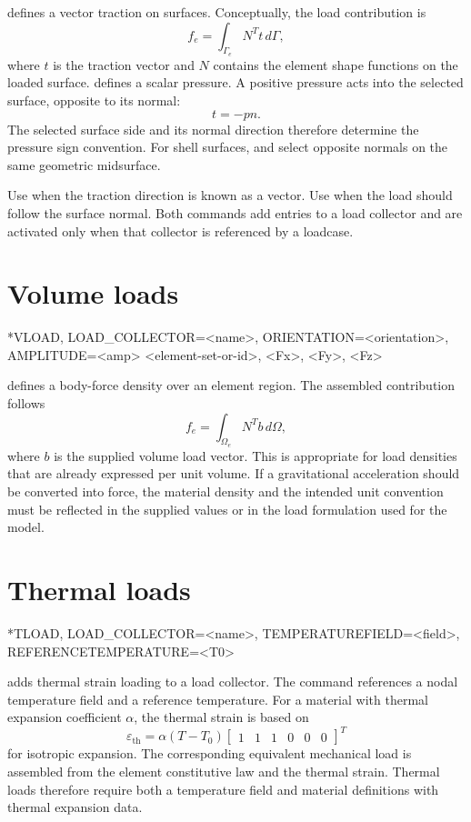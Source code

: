  defines a vector traction on surfaces. Conceptually, the load contribution is
\[
f_e = \int_{\Gamma_e} N^T t \, d\Gamma ,
\]
where \(t\) is the traction vector and \(N\) contains the element shape functions on the loaded surface.  defines a scalar pressure. A positive pressure acts into the selected surface, opposite to its normal:
\[
t = -p n .
\]
The selected surface side and its normal direction therefore determine the pressure sign convention. For shell surfaces,  and  select opposite normals on the same geometric midsurface.

Use  when the traction direction is known as a vector. Use  when the load should follow the surface normal. Both commands add entries to a load collector and are activated only when that collector is referenced by a loadcase.

\section{Volume loads}

\begin{syntax}
*VLOAD, LOAD_COLLECTOR=<name>, ORIENTATION=<orientation>, AMPLITUDE=<amp>
<element-set-or-id>, <Fx>, <Fy>, <Fz>
\end{syntax}

 defines a body-force density over an element region. The assembled contribution follows
\[
f_e = \int_{\Omega_e} N^T b \, d\Omega ,
\]
where \(b\) is the supplied volume load vector. This is appropriate for load densities that are already expressed per unit volume. If a gravitational acceleration should be converted into force, the material density and the intended unit convention must be reflected in the supplied values or in the load formulation used for the model.

\section{Thermal loads}

\begin{syntax}
*TLOAD, LOAD_COLLECTOR=<name>, TEMPERATUREFIELD=<field>, REFERENCETEMPERATURE=<T0>
\end{syntax}

 adds thermal strain loading to a load collector. The command references a nodal temperature field and a reference temperature. For a material with thermal expansion coefficient \(\alpha\), the thermal strain is based on
\[
\varepsilon_\mathrm{th} = \alpha (T - T_0)
\begin{bmatrix}
1 & 1 & 1 & 0 & 0 & 0
\end{bmatrix}^T
\]
for isotropic expansion. The corresponding equivalent mechanical load is assembled from the element constitutive law and the thermal strain. Thermal loads therefore require both a temperature field and material definitions with thermal expansion data.

